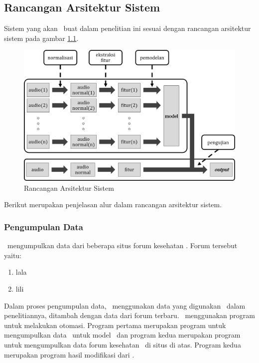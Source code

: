 \chapter{\babTiga}
\section{Rancangan Arsitektur Sistem}
Sistem yang akan \saya~buat dalam penelitian ini sesuai dengan rancangan arsitektur sistem pada gambar \ref{fig:arsitektur_sistem}.
\begin{figure}
  \centering
  \includegraphics[width=\linewidth]{pics/arsitektur_sistemc}
  \caption{Rancangan Arsitektur Sistem}
  \label{fig:arsitektur_sistem}
\end{figure}

Berikut merupakan penjelasan alur dalam rancangan arsitektur sistem.
	\subsection{Pengumpulan Data}
	\Saya~mengumpulkan data dari beberapa situs forum kesehatan \ioa. Forum tersebut yaitu:
	\begin{enumerate}
		\item lala
		\item lili
	\end{enumerate}
	Dalam proses pengumpulan data, \saya~menggunakan data yang digunakan \skripsiRadit~dalam penelitiannya, ditambah dengan data dari forum terbaru. \Saya~menggunakan program untuk melakukan otomasi. Program pertama merupakan program untuk mengumpulkan data \ioa~untuk model \we~dan program kedua merupakan program untuk mengumpulkan data forum kesehatan \ol~di situs di atas. Program kedua merupakan program hasil modifikasi dari \skripsiRadit.
	
